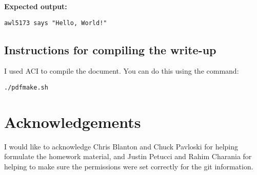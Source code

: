 \documentclass{article}
\begin{document}
\begin{spacing}{1.1}
\textbf{Expected output:}
\begin{verbatim}
awl5173 says "Hello, World!"
\end{verbatim}

\subsection{Instructions for compiling the write-up}

I used ACI to compile the document.  You can do this using the command:
\begin{verbatim}
./pdfmake.sh
\end{verbatim}

\section{Acknowledgements}

I would like to acknowledge Chris Blanton and Chuck Pavloski for helping formulate the homework material, and Justin Petucci and Rahim Charania for helping to make sure the permissions were set correctly for the git information.



\end{spacing}


\end{document}
